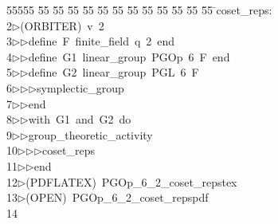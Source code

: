 %
%
\begin{tabbing}
55555 \= 55 \= 55 \= 55 \= 55 \= 55 \= 55 \= 55 \= 55 \= 55 \= 55 \= 55 \= 55 \= \>coset\_reps:\\[0pt]
2\>$\triangleright$\>(ORBITER)\ v\ 2\ \\[0pt]
3\>$\triangleright$\>$\triangleright$\>define\ F\ finite\_field\ q\ 2\ end\ \\[0pt]
4\>$\triangleright$\>$\triangleright$\>define\ G1\ linear\_group\ PGOp\ 6\ F\ end\ \\[0pt]
5\>$\triangleright$\>$\triangleright$\>define\ G2\ linear\_group\ PGL\ 6\ F\ \\[0pt]
6\>$\triangleright$\>$\triangleright$\>$\triangleright$\>symplectic\_group\ \\[0pt]
7\>$\triangleright$\>$\triangleright$\>end\ \\[0pt]
8\>$\triangleright$\>$\triangleright$\>with\ G1\ and\ G2\ do\ \\[0pt]
9\>$\triangleright$\>$\triangleright$\>group\_theoretic\_activity\ \\[0pt]
10\>$\triangleright$\>$\triangleright$\>$\triangleright$\>coset\_reps\ \\[0pt]
11\>$\triangleright$\>$\triangleright$\>end\\[0pt]
12\>$\triangleright$\>(PDFLATEX)\ PGOp\_6\_2\_coset\_repstex\\[0pt]
13\>$\triangleright$\>(OPEN)\ PGOp\_6\_2\_coset\_repspdf\\[0pt]
14\>\end{tabbing}
